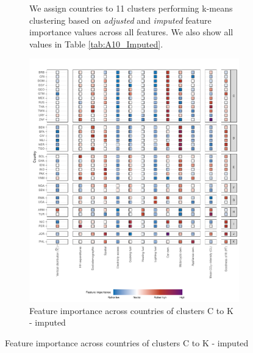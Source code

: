 \begin{figure}[ht!]
\begin{subfigure}[b]{\textwidth}
\begin{subcaption2}
    We assign countries to 11 clusters performing k-means clustering based on \textit{adjusted} and \textit{imputed} feature importance values across all features. We also show all values in Table \ref{tab:A10_Imputed}.
    \end{subcaption2}
    \end{subfigure}
    
\end{figure}
\clearpage

\clearpage
\begin{figure}[ht!]\ContinuedFloat
    \centering
    \begin{subfigure}[b]{\textwidth}
    \centering
    \caption{Feature importance across countries of clusters C to K - imputed}\label{fig:fig_4_1_imputed}
    \includegraphics{Figure 4/Figure_4_Corrected_Imputed_2.pdf}
    \begin{subcaption2}

\end{subcaption2}
\end{subfigure}
\end{figure}
